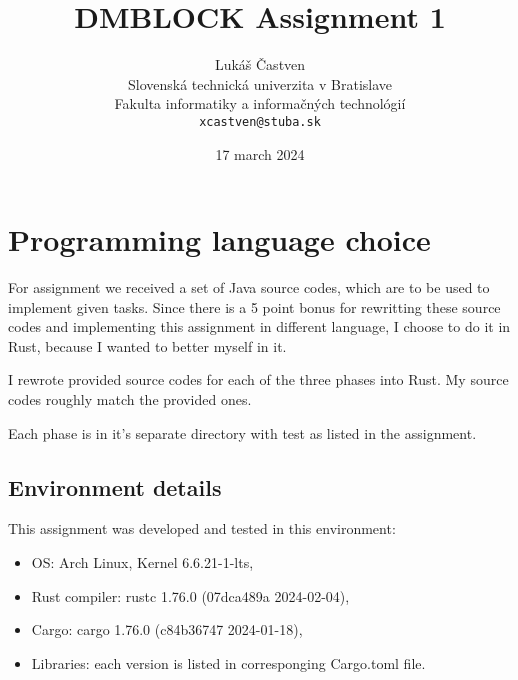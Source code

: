 \documentclass[11pt,a4paper]{article}
\title{DMBLOCK Assignment 1}
\author{Lukáš Častven\\[2pt]
	{\small Slovenská technická univerzita v Bratislave}\\
	{\small Fakulta informatiky a informačných technológií}\\
	{\small \texttt{xcastven@stuba.sk}}
	}
\date{\small 17 march 2024}
\begin{document}
\pagestyle{plain}

\maketitle
\tableofcontents
\pagebreak

\section{Programming language choice}

For assignment we received a set of Java source codes, which are to be used
to implement given tasks. Since there is a 5 point bonus for rewritting these
source codes and implementing this assignment in different language, I choose
to do it in Rust\cite{rustlangRustProgramming}, because I wanted to better myself in it.

I rewrote provided source codes for each of the three phases into Rust. My source
codes roughly match the provided ones.

Each phase is in it's separate directory with test as listed in the assignment.

\subsection{Environment details}

This assignment was developed and tested in this environment:

\begin{itemize}
    \item OS: Arch Linux, Kernel 6.6.21-1-lts,
    \item Rust compiler: rustc 1.76.0 (07dca489a 2024-02-04),
    \item Cargo: cargo 1.76.0 (c84b36747 2024-01-18),
    \item Libraries: each version is listed in corresponging Cargo.toml file.
\end{itemize}











\end{document}
